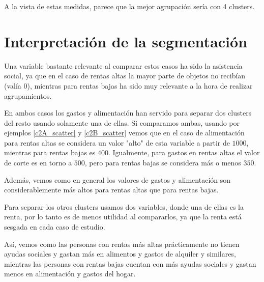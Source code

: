 A la vista de estas medidas, parece que la mejor agrupación sería con 4 clusters.


\section{Interpretación de la segmentación}

Una variable bastante relevante al comparar estos casos ha sido la asistencia social, ya que en el caso de rentas altas la mayor parte de objetos no recibían (valía 0), mientras para rentas bajas ha sido muy relevante a la hora de realizar agrupamientos.

En ambos casos los gastos y alimentación han servido para separar dos clusters del resto usando solamente una de ellas. Si comparamos ambas, usando por ejemplos \eqref{c2A_scatter} y \eqref{c2B_scatter} vemos que en el caso de alimentación para rentas altas se considera un valor "alto" de esta variable a partir de $1000$, mientras para rentas bajas es $400$. Igualmente, para gastos en rentas altas el valor de corte es en torno a $500$, pero para rentas bajas se considera más o menos $350$.

Además, vemos como en general los valores de gastos y alimentación son considerablemente más altos para rentas altas que para rentas bajas.

Para separar los otros clusters usamos dos variables, donde una de ellas es la renta, por lo tanto es de menos utilidad al compararlos, ya que la renta está sesgada en cada caso de estudio.

Así, vemos como las personas con rentas más altas prácticamente no tienen ayudas sociales y gastan más en alimentos y gastos de alquiler y similares, mientras las personas con rentas bajas cuentan con más ayudas sociales y gastan menos en alimentación y gastos del hogar.




